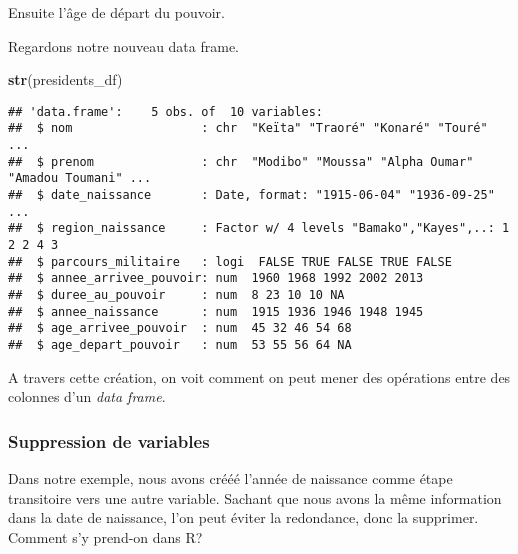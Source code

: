 \documentclass[]{book}
\newenvironment{Shaded}{\begin{snugshade}}{\end{snugshade}}
\newcommand{\KeywordTok}[1]{\textcolor[rgb]{0.13,0.29,0.53}{\textbf{#1}}}
\newcommand{\StringTok}[1]{\textcolor[rgb]{0.31,0.60,0.02}{#1}}
\newcommand{\OtherTok}[1]{\textcolor[rgb]{0.56,0.35,0.01}{#1}}
\newcommand{\OperatorTok}[1]{\textcolor[rgb]{0.81,0.36,0.00}{\textbf{#1}}}
\newcommand{\NormalTok}[1]{#1}
\begin{document}
Ensuite l'âge de départ du pouvoir.

\begin{Shaded}
\end{Shaded}

Regardons notre nouveau data frame.

\begin{Shaded}
\begin{Highlighting}[]
\KeywordTok{str}\NormalTok{(presidents_df)}
\end{Highlighting}
\end{Shaded}

\begin{verbatim}
## 'data.frame':    5 obs. of  10 variables:
##  $ nom                  : chr  "Keïta" "Traoré" "Konaré" "Touré" ...
##  $ prenom               : chr  "Modibo" "Moussa" "Alpha Oumar" "Amadou Toumani" ...
##  $ date_naissance       : Date, format: "1915-06-04" "1936-09-25" ...
##  $ region_naissance     : Factor w/ 4 levels "Bamako","Kayes",..: 1 2 2 4 3
##  $ parcours_militaire   : logi  FALSE TRUE FALSE TRUE FALSE
##  $ annee_arrivee_pouvoir: num  1960 1968 1992 2002 2013
##  $ duree_au_pouvoir     : num  8 23 10 10 NA
##  $ annee_naissance      : num  1915 1936 1946 1948 1945
##  $ age_arrivee_pouvoir  : num  45 32 46 54 68
##  $ age_depart_pouvoir   : num  53 55 56 64 NA
\end{verbatim}

A travers cette création, on voit comment on peut mener des opérations
entre des colonnes d'un \emph{data frame}.

\subsubsection{Suppression de variables}\label{suppression-de-variables}

Dans notre exemple, nous avons crééé l'année de naissance comme étape
transitoire vers une autre variable. Sachant que nous avons la même
information dans la date de naissance, l'on peut éviter la redondance,
donc la supprimer. Comment s'y prend-on dans R?

\begin{Shaded}
\end{Shaded}
\end{document}
